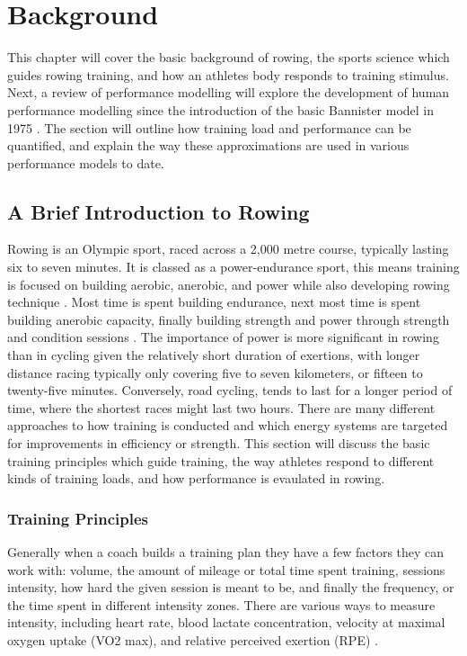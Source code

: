 \chapter{Background}
\label{ch:background}
This chapter will cover the basic background of rowing, the sports science which guides rowing training, and how an athletes body responds to training stimulus. Next, a review of performance modelling will explore the development of human performance modelling since the introduction of the basic Bannister model in 1975 \autocite{Bannister1976}. The section will outline how training load and performance can be quantified, and explain the way these approximations are used in various performance models to date.

\section{A Brief Introduction to Rowing}
Rowing is an Olympic sport, raced across a 2,000 metre course, typically lasting six to seven minutes. It is classed as a power-endurance sport, this means training is focused on building aerobic, anerobic, and power while also developing rowing technique \autocite{Mäestu2005}. Most time is spent building endurance, next most time is spent building anerobic capacity, finally building strength and power through strength and condition sessions \autocite{Seiler2006}. The importance of power is more significant in rowing than in cycling given the relatively short duration of exertions, with longer distance racing typically only covering five to seven kilometers, or fifteen to twenty-five minutes. Conversely, road cycling, tends to last for a longer period of time, where the shortest races might last two hours. There are many different approaches to how training is conducted and which energy systems are targeted for improvements in efficiency or strength. This section will discuss the basic training principles which guide training, the way athletes respond to different kinds of training loads, and how performance is evaulated in rowing.

\subsection{\label{sub:training_principles}Training Principles}
Generally when a coach builds a training plan they have a few factors they can work with: volume, the amount of mileage or total time spent training, sessions intensity, how hard the given session is meant to be, and finally the frequency, or the time spent in different intensity zones. There are various ways to measure intensity, including heart rate, blood lactate concentration, velocity at maximal oxygen uptake (VO2 max), and relative perceived exertion (RPE) \autocite{Rosenblat2019}. 

